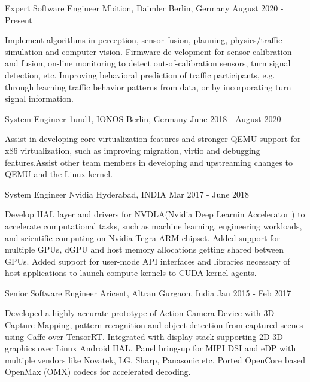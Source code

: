 
\begin{cventries}
  \cventry
    {Expert Software Engineer}
    {Mbition, Daimler}
    {Berlin, Germany}
    {August 2020 - Present}
    {
      \begin{cvitems}
        \item {Implement algorithms in perception, sensor fusion, planning, physics/traffic simulation and computer vision. Firmware de-velopment for sensor calibration and fusion, on-line monitoring to detect out-of-calibration sensors, turn signal detection, etc. Improving behavioral prediction of traffic participants, e.g. through learning traffic behavior patterns from data, or by incorporating turn signal information.}
      \end{cvitems}
    }	

  \cventry
    {System Engineer}
    {1und1, IONOS}
    {Berlin, Germany}
    {June 2018 - August 2020}
    {
      \begin{cvitems}
        \item {Assist in developing core virtualization features and stronger QEMU support for x86 virtualization, such as improving migration, virtio and debugging features.Assist other team members in developing and upstreaming changes to QEMU and the Linux kernel. }
      \end{cvitems}
    }	

  \cventry
    {System Engineer}
    {Nvidia}
    {Hyderabad, INDIA}
    {Mar 2017 - June 2018 }
    {
      \begin{cvitems}
        \item {Develop HAL layer and drivers for NVDLA(Nvidia Deep Learnin Accelerator ) to accelerate computational tasks, such as machine learning, engineering workloads, and scientific computing on Nvidia Tegra ARM chipset. Added support for multiple GPUs, dGPU and host memory allocations getting shared between GPUs. Added support for user-mode API interfaces and libraries necessary of host applications to launch compute kernels to CUDA kernel agents. }
      \end{cvitems}
    }	
    
  \cventry
    {Senior Software Engineer}
    {Aricent, Altran}
    {Gurgaon, India}
    {Jan 2015 - Feb 2017}
    {
      \begin{cvitems}
        \item {Developed a highly accurate prototype of Action Camera Device with 3D Capture Mapping, pattern recognition and object detection from captured scenes using Caffe over TensorRT. Integrated with display stack supporting 2D 3D graphics over Linux Android HAL. Panel bring-up for MIPI DSI and eDP with multiple vendors like Novatek, LG, Sharp, Panasonic etc. Ported OpenCore based OpenMax (OMX) codecs for accelerated decoding. }
      \end{cvitems}
    }	  
	  

\end{cventries}
